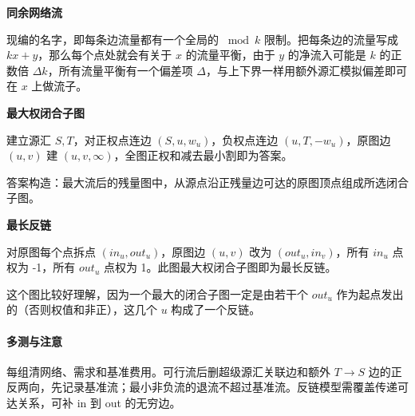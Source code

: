 \textbf{同余网络流}

现编的名字，即每条边流量都有一个全局的 $\bmod k$ 限制。把每条边的流量写成 $kx+y$，那么每个点处就会有关于 $x$ 的流量平衡，由于 $y$ 的净流入可能是 $k$ 的正数倍 $\Delta k$，所有流量平衡有一个偏差项 $\Delta$，与上下界一样用额外源汇模拟偏差即可在 $x$ 上做流子。

\textbf{最大权闭合子图}

建立源汇 $S,T$，对正权点连边 $(S,u,w_u)$，负权点连边 $(u,T,-w_u)$，原图边 $(u,v)$ 建 $(u,v,\infty)$，全图正权和减去最小割即为答案。

答案构造：最大流后的残量图中，从源点沿正残量边可达的原图顶点组成所选闭合子图。

\textbf{最长反链}

对原图每个点拆点 $(in_u,out_u)$，原图边 $(u,v)$ 改为 $(out_u,in_v)$，所有 $in_u$ 点权为 -1，所有 $out_u$ 点权为 1。此图最大权闭合子图即为最长反链。

这个图比较好理解，因为一个最大的闭合子图一定是由若干个 $out_u$ 作为起点发出的（否则权值和非正），这几个 $u$ 构成了一个反链。

\paragraph{多测与注意} 每组清网络、需求和基准费用。可行流后删超级源汇关联边和额外 $T\to S$ 边的正反两向，先记录基准流；最小非负流的退流不超过基准流。反链模型需覆盖传递可达关系，可补 in 到 out 的无穷边。
